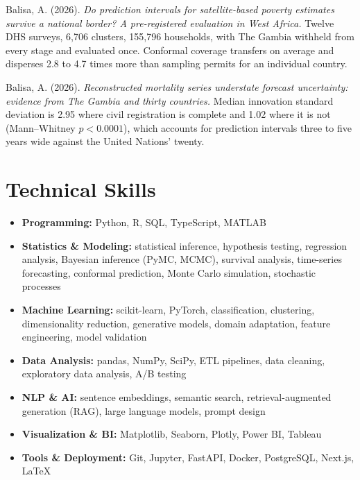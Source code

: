 \documentclass[a4paper,10pt]{article}
\begin{document}
\vspace{0.35em}

Balisa, A. (2026). \textit{Do prediction intervals for satellite-based poverty
estimates survive a national border? A pre-registered evaluation in West
Africa.} Twelve DHS surveys, 6,706 clusters, 155,796 households, with The
Gambia withheld from every stage and evaluated once. Conformal coverage
transfers on average and disperses 2.8 to 4.7 times more than sampling permits
for an individual country.

\vspace{0.35em}

Balisa, A. (2026). \textit{Reconstructed mortality series understate forecast
uncertainty: evidence from The Gambia and thirty countries.} Median innovation
standard deviation is 2.95 where civil registration is complete and 1.02 where
it is not (Mann--Whitney $p < 0.0001$), which accounts for prediction intervals
three to five years wide against the United Nations' twenty.

\section{Technical Skills}

\begin{itemize}
  \item \textbf{Programming:} Python, R, SQL, TypeScript, MATLAB
  \item \textbf{Statistics \& Modeling:} statistical inference, hypothesis
    testing, regression analysis, Bayesian inference (PyMC, MCMC), survival
    analysis, time-series forecasting, conformal prediction, Monte Carlo
    simulation, stochastic processes
  \item \textbf{Machine Learning:} scikit-learn, PyTorch, classification,
    clustering, dimensionality reduction, generative models, domain adaptation,
    feature engineering, model validation
  \item \textbf{Data Analysis:} pandas, NumPy, SciPy, ETL pipelines, data
    cleaning, exploratory data analysis, A/B testing
  \item \textbf{NLP \& AI:} sentence embeddings, semantic search,
    retrieval-augmented generation (RAG), large language models, prompt design
  \item \textbf{Visualization \& BI:} Matplotlib, Seaborn, Plotly, Power BI,
    Tableau
  \item \textbf{Tools \& Deployment:} Git, Jupyter, FastAPI, Docker,
    PostgreSQL, Next.js, \LaTeX{}
\end{itemize}
\end{document}
